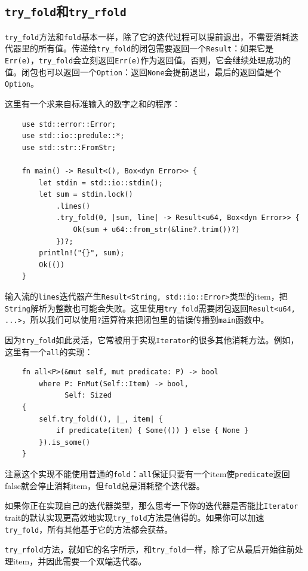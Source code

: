 \subsection{\texttt{try\_fold}和\texttt{try\_rfold}}
\texttt{try\_fold}方法和\texttt{fold}基本一样，除了它的迭代过程可以提前退出，不需要消耗迭代器里的所有值。传递给\texttt{try\_fold}的闭包需要返回一个\texttt{Result}：如果它是\texttt{Err(e)}，\texttt{try\_fold}会立刻返回\texttt{Err(e)}作为返回值。否则，它会继续处理成功的值。闭包也可以返回一个\texttt{Option}：返回\texttt{None}会提前退出，最后的返回值是个\texttt{Option}。

这里有一个求来自标准输入的数字之和的程序：
\begin{verbatim}
    use std::error::Error;
    use std::io::predule::*;
    use std::str::FromStr;

    fn main() -> Result<(), Box<dyn Error>> {
        let stdin = std::io::stdin();
        let sum = stdin.lock()
            .lines()
            .try_fold(0, |sum, line| -> Result<u64, Box<dyn Error>> {
                Ok(sum + u64::from_str(&line?.trim())?)
            })?;
        println!("{}", sum);
        Ok(())
    }
\end{verbatim}

输入流的\texttt{lines}迭代器产生\texttt{Result<String, std::io::Error>}类型的item，把\texttt{String}解析为整数也可能会失败。这里使用\texttt{try\_fold}需要闭包返回\texttt{Result<u64, ...>}，所以我们可以使用\texttt{?}运算符来把闭包里的错误传播到\texttt{main}函数中。

因为\texttt{try\_fold}如此灵活，它常被用于实现\texttt{Iterator}的很多其他消耗方法。例如，这里有一个\texttt{all}的实现：
\begin{verbatim}
    fn all<P>(&mut self, mut predicate: P) -> bool
        where P: FnMut(Self::Item) -> bool,
              Self: Sized
    {
        self.try_fold((), |_, item| {
            if predicate(item) { Some(()) } else { None }
        }).is_some()
    }
\end{verbatim}

注意这个实现不能使用普通的\texttt{fold}：\texttt{all}保证只要有一个item使\texttt{predicate}返回false就会停止消耗item，但\texttt{fold}总是消耗整个迭代器。

如果你正在实现自己的迭代器类型，那么思考一下你的迭代器是否能比\texttt{Iterator} trait的默认实现更高效地实现\texttt{try\_fold}方法是值得的。如果你可以加速\texttt{try\_fold}，所有其他基于它的方法都会获益。

\texttt{try\_rfold}方法，就如它的名字所示，和\texttt{try\_fold}一样，除了它从最后开始往前处理item，并因此需要一个双端迭代器。

